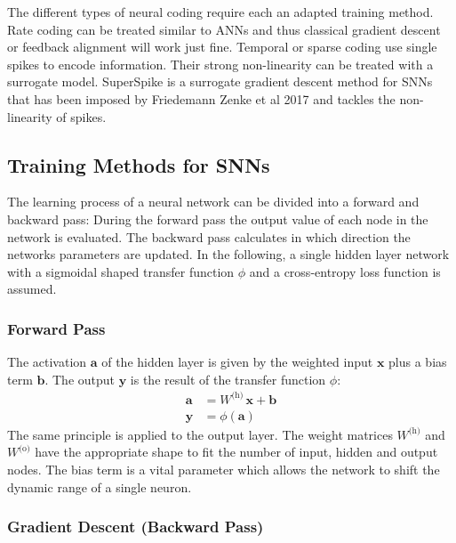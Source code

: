 The different types of neural coding require each an adapted training method. Rate coding can be treated similar to ANNs and thus classical gradient descent or feedback alignment will work just fine. Temporal or sparse coding use single spikes to encode information. Their strong non-linearity can be treated with a surrogate model. SuperSpike is a surrogate gradient descent method for SNNs that has been imposed by Friedemann Zenke et al 2017 and tackles the non-linearity of spikes.\\

\subsection{Training Methods for SNNs}

The learning process of a neural network can be divided into a forward and backward pass: During the forward pass the output value of each node in the network is evaluated. The backward pass calculates in which direction the networks parameters are updated. In the following, a single hidden layer network with a sigmoidal shaped transfer function $\phi$ and a cross-entropy loss function is assumed. \\

\subsubsection{Forward Pass}
The activation $\mathbf{a}$ of the hidden layer is given by the weighted input $\mathbf{x}$ plus a bias term $\mathbf{b}$. The output $\mathbf{y}$ is the result of the transfer function $\phi$:
\begin{align}
\mathbf{a} &= W^{\text{(h)}} \, \mathbf{x} + \mathbf{b} \\
\mathbf{y} &= \phi(\mathbf{a})
\end{align} 
The same principle is applied to the output layer. The weight matrices $W^{\text{(h)}}$ and $ W^{\text{(o)}}$ have the appropriate shape to fit the number of input, hidden and output nodes. The bias term is a vital parameter which allows the network to shift the dynamic range of a single neuron.

\subsubsection{Gradient Descent (Backward Pass)}

